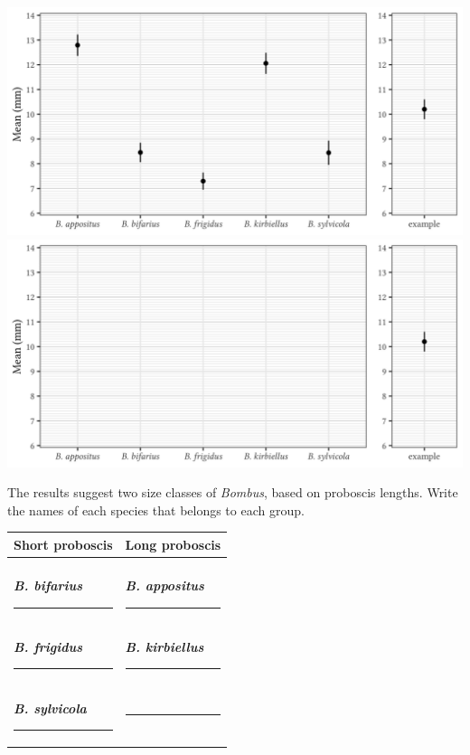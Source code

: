 \documentclass[12pt, hidelinks]{exam}
\begin{document}
\begin{questions}
\ifprintanswers
	\includegraphics[width=\linewidth]{mean_proboscis_plot_key}
\else
	\includegraphics[width=\linewidth]{mean_proboscis_plot_blank}
\fi


\newpage

\question
The results suggest two size classes of \textit{Bombus}, based on
proboscis lengths.  Write the names of each species that belongs to 
each group.

\begin{tabular}{@{}ll@{}} %
	\toprule
	Short proboscis & Long proboscis \tabularnewline
	\midrule
	& \tabularnewline
	\ifprintanswers \textbf{\textit{B. bifarius}} \else \rule{2in}{0.4pt} \fi &
	\ifprintanswers \textbf{\textit{B. appositus}} \else \rule{2in}{0.4pt} \fi 
	\tabularnewline[2em]
	\ifprintanswers \textbf{\textit{B. frigidus}} \else \rule{2in}{0.4pt} \fi &
	\ifprintanswers \textbf{\textit{B. kirbiellus}} \else \rule{2in}{0.4pt} \fi
	\tabularnewline[2em]
	\ifprintanswers \textbf{\textit{B. sylvicola}} \else \rule{2in}{0.4pt} \fi &
	\rule{1in}{0.4pt} \tabularnewline
	\bottomrule
\end{tabular}


\end{questions}
\end{document}
